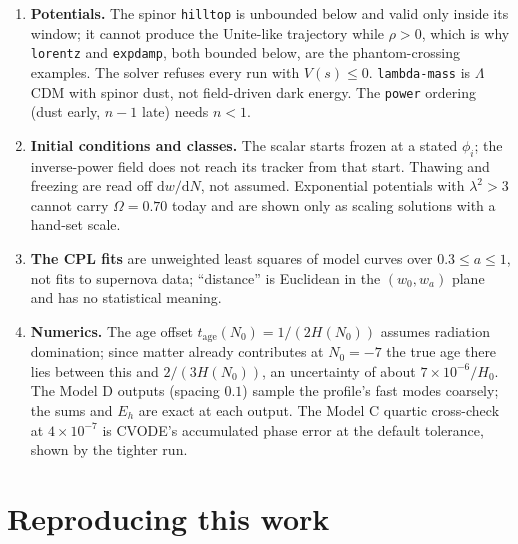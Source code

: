 \documentclass[11pt,a4paper]{article}
\newcommand{\dd}{\mathrm{d}}
\begin{document}
\begin{enumerate}[label=\arabic*.]
  energy--momentum tensor must be built with $D_\nu$, not $\partial_\nu$.
\item \textbf{Potentials.} The spinor \texttt{hilltop} is unbounded below and valid only inside its
  window; it cannot produce the Unite-like trajectory while $\rho>0$, which is why
  \texttt{lorentz} and \texttt{expdamp}, both bounded below, are the phantom-crossing examples. The
  solver refuses every run with $V(s)\le0$. \texttt{lambda-mass} is $\Lambda$CDM with spinor dust,
  not field-driven dark energy. The \texttt{power} ordering (dust early, $n-1$ late) needs $n<1$.
\item \textbf{Initial conditions and classes.} The scalar starts frozen at a stated $\phi_i$; the
  inverse-power field does not reach its tracker from that start. Thawing and freezing are read
  off $\dd w/\dd N$, not assumed. Exponential potentials with $\lambda^2>3$ cannot carry
  $\Omega=0.70$ today and are shown only as scaling solutions with a hand-set scale.
\item \textbf{The CPL fits} are unweighted least squares of model curves over $0.3\le a\le1$, not
  fits to supernova data; ``distance'' is Euclidean in the $(w_0,w_a)$ plane and has no
  statistical meaning.
\item \textbf{Numerics.} The age offset $t_{\mathrm{age}}(N_0)=1/(2H(N_0))$ assumes radiation
  domination; since matter already contributes at $N_0=-7$ the true age there lies between this and
  $2/(3H(N_0))$, an uncertainty of about $7\times10^{-6}/H_0$. The Model D outputs (spacing $0.1$)
  sample the profile's fast modes coarsely; the sums and $E_h$ are exact at each output. The
  Model C quartic cross-check at $4\times10^{-7}$ is CVODE's accumulated phase error at the default
  tolerance, shown by the tighter run.
\end{enumerate}

\section{Reproducing this work}\label{sec:repro}
\end{document}
